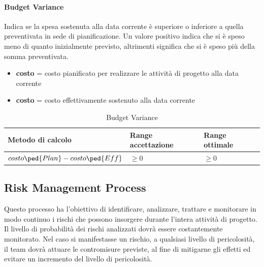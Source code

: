 		\paragraph{Budget Variance}
		Indica se la spesa sostenuta alla data corrente è superiore o inferiore a quella preventivata in sede di pianificazione.
		Un valore positivo indica che si è speso meno di quanto inizialmente previsto, altrimenti significa che si è speso più della somma preventivata.
		
		\begin{itemize}
			\item \textbf{costo} = costo pianificato per realizzare le attività di progetto alla data corrente
			\item \textbf{costo} = costo effettivamente sostenuto alla data corrente
		\end{itemize}
		
		\begin{table}[H]
			\begin{longtable}{>{\centering\arraybackslash}p{5cm}|>{\centering\arraybackslash}p{5cm} | >{\centering\arraybackslash}p{5cm}}
				\hline
				\rowcolor{Gray}
				\textbf{Metodo di calcolo} & \textbf{Range accettazione} & \textbf{Range ottimale} \\
				\hline
				\begin{math}
				{costo\ped{Plan} - costo\ped{Eff}}
				\end{math} & \begin{math}\geq{0} \end{math}  & \begin{math}\geq{0} \end{math}
			\end{longtable}
			\caption{Budget Variance}
		\end{table}
		
	\subsection{Risk Management Process}
	Questo processo ha l'obiettivo di identificare, analizzare, trattare e monitorare in modo continuo i rischi che possono insorgere durante l’intera attività di progetto.
	Il livello di probabilità dei rischi analizzati dovrà essere costantemente monitorato. Nel caso si manifestasse un rischio, a qualsiasi livello di pericolosità, il team dovrà attuare le contromisure previste, al fine di mitigarne gli effetti ed evitare un incremento del livello di pericolosità.

